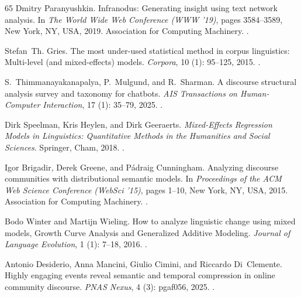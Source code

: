\documentclass[11pt]{article}
\begin{document}
\begin{thebibliography}{65}
Dmitry Paranyushkin.
\newblock Infranodus: Generating insight using text network analysis.
\newblock In \emph{The World Wide Web Conference ({WWW} '19)}, pages
  3584--3589, New York, NY, USA, 2019. Association for Computing Machinery.
\newblock {}.

Stefan~Th. Gries.
\newblock The most under-used statistical method in corpus linguistics:
  Multi-level (and mixed-effects) models.
\newblock \emph{Corpora}, 10 (1): 95--125, 2015.
\newblock {}.

S.~Thimmanayakanapalya, P.~Mulgund, and R.~Sharman.
\newblock A discourse structural analysis survey and taxonomy for chatbots.
\newblock \emph{{AIS} Transactions on Human-Computer Interaction}, 17
  (1): 35--79, 2025.
\newblock {}.

Dirk Speelman, Kris Heylen, and Dirk Geeraerts.
\newblock \emph{Mixed-Effects Regression Models in Linguistics: Quantitative
  Methods in the Humanities and Social Sciences}.
\newblock Springer, Cham, 2018.
\newblock {}.

Igor Brigadir, Derek Greene, and P\'{a}draig Cunningham.
\newblock Analyzing discourse communities with distributional semantic models.
\newblock In \emph{Proceedings of the ACM Web Science Conference (WebSci '15)},
  pages 1--10, New York, NY, USA, 2015. Association for Computing Machinery.
\newblock {}.

Bodo Winter and Martijn Wieling.
\newblock How to analyze linguistic change using mixed models, {Growth Curve
  Analysis} and {Generalized Additive Modeling}.
\newblock \emph{Journal of Language Evolution}, 1 (1): 7--18,
  2016.
\newblock {}.

Antonio Desiderio, Anna Mancini, Giulio Cimini, and Riccardo Di~Clemente.
\newblock Highly engaging events reveal semantic and temporal compression in
  online community discourse.
\newblock \emph{{PNAS} Nexus}, 4 (3): pgaf056, 2025.
\newblock {}.


\end{thebibliography}
\end{document}

